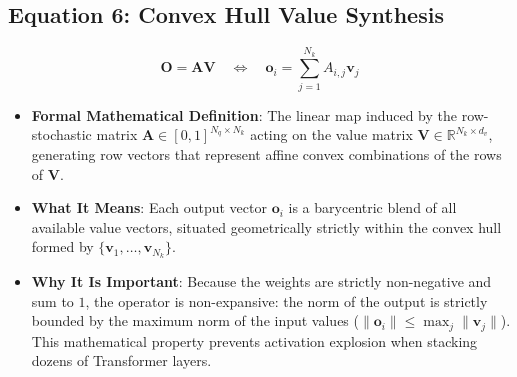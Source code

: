 \documentclass[11pt,a4paper]{article}
\theoremstyle{definition}
\begin{document}
\subsection{\textbf{Equation 6: Convex Hull Value Synthesis}}
{\boldmath
\begin{equation}
\mathbf{O} = \mathbf{A}\mathbf{V} \quad \Longleftrightarrow \quad \mathbf{o}_i = \sum_{j=1}^{N_k} A_{i, j} \mathbf{v}_j
\end{equation}
}
\begin{itemize}
    \item \textbf{Formal Mathematical Definition}:
    The linear map induced by the row-stochastic matrix $\mathbf{A} \in [0, 1]^{N_q \times N_k}$ acting on the value matrix $\mathbf{V} \in \mathbb{R}^{N_k \times d_v}$, generating row vectors that represent affine convex combinations of the rows of $\mathbf{V}$.
    \item \textbf{What It Means}:
    Each output vector $\mathbf{o}_i$ is a barycentric blend of all available value vectors, situated geometrically strictly within the convex hull formed by $\{\mathbf{v}_1, \dots, \mathbf{v}_{N_k}\}$.
    \item \textbf{Why It Is Important}:
    Because the weights are strictly non-negative and sum to $1$, the operator is non-expansive: the norm of the output is strictly bounded by the maximum norm of the input values ($\|\mathbf{o}_i\| \le \max_j \|\mathbf{v}_j\|$). This mathematical property prevents activation explosion when stacking dozens of Transformer layers.
\end{itemize}
\end{document}
